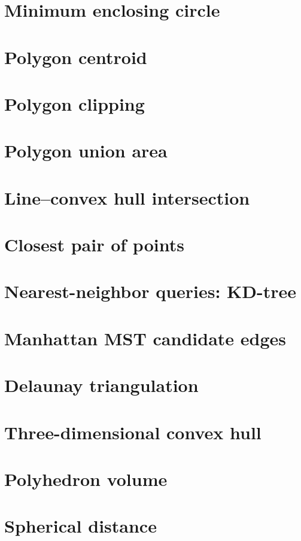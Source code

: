 \section{Minimum enclosing circle}

\section{Polygon centroid}

\section{Polygon clipping}

\section{Polygon union area}

\section{Line--convex hull intersection}

\section{Closest pair of points}

\section{Nearest-neighbor queries: KD-tree}

\section{Manhattan MST candidate edges}

\section{Delaunay triangulation}

\section{Three-dimensional convex hull}

\section{Polyhedron volume}

\section{Spherical distance}

